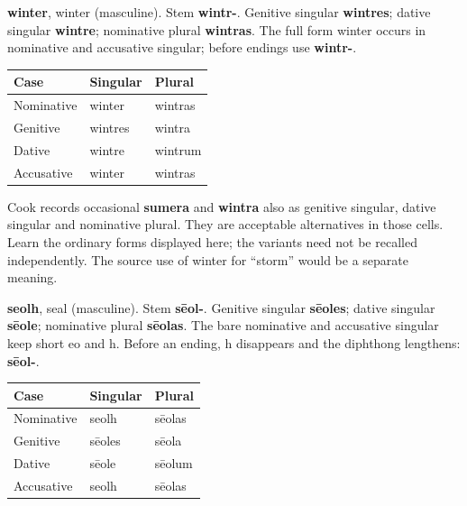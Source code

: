 \textbf{winter}, winter (masculine). Stem \textbf{wintr-}. Genitive singular \textbf{wintres}; dative singular \textbf{wintre}; nominative plural \textbf{wintras}. The full form winter occurs in nominative and accusative singular; before endings use \textbf{wintr-}.

\par\begingroup
\fontsize{10.5}{13.2}\selectfont
\setlength{\LTleft}{0pt}\setlength{\LTright}{\fill}
\noindent
\begin{tabular}{@{}>{\raggedright\arraybackslash}p{39.46mm}>{\raggedright\arraybackslash}p{39.46mm}>{\raggedright\arraybackslash}p{39.46mm}@{}}
\toprule
\textbf{Case} & \textbf{Singular} & \textbf{Plural} \\
\midrule
Nominative & winter & wintras \\
Genitive & wintres & wintra \\
Dative & wintre & wintrum \\
Accusative & winter & wintras \\
\bottomrule
\end{tabular}
\par\endgroup

Cook records occasional \textbf{sumera} and \textbf{wintra} also as genitive singular, dative singular and nominative plural. They are acceptable alternatives in those cells. Learn the ordinary forms displayed here; the variants need not be recalled independently. The source use of winter for “storm” would be a separate meaning.

\textbf{seolh}, seal (masculine). Stem \textbf{sēol-}. Genitive singular \textbf{sēoles}; dative singular \textbf{sēole}; nominative plural \textbf{sēolas}. The bare nominative and accusative singular keep short eo and h. Before an ending, h disappears and the diphthong lengthens: \textbf{sēol-}.

\par\begingroup
\fontsize{10.5}{13.2}\selectfont
\setlength{\LTleft}{0pt}\setlength{\LTright}{\fill}
\noindent
\begin{tabular}{@{}>{\raggedright\arraybackslash}p{39.46mm}>{\raggedright\arraybackslash}p{39.46mm}>{\raggedright\arraybackslash}p{39.46mm}@{}}
\toprule
\textbf{Case} & \textbf{Singular} & \textbf{Plural} \\
\midrule
Nominative & seolh & sēolas \\
Genitive & sēoles & sēola \\
Dative & sēole & sēolum \\
Accusative & seolh & sēolas \\
\bottomrule
\end{tabular}
\par\endgroup

